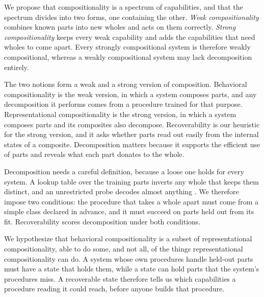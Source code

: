 \documentclass[10pt]{article}
\theoremstyle{plain}
\theoremstyle{remark}
\begin{document}
We propose that compositionality is a spectrum of capabilities, and that the spectrum divides into two forms, one containing the other. \emph{Weak compositionality} combines known parts into new wholes and acts on them correctly. \emph{Strong compositionality} keeps every weak capability and adds the capabilities that need wholes to come apart. Every strongly compositional system is therefore weakly compositional, whereas a weakly compositional system may lack decomposition entirely.

The two notions form a weak and a strong version of composition. Behavioral compositionality is the weak version, in which a system composes parts, and any decomposition it performs comes from a procedure trained for that purpose. Representational compositionality is the strong version, in which a system composes parts and its composites also decompose. Recoverability is our heuristic for the strong version, and it asks whether parts read out easily from the internal states of a composite. Decomposition matters because it supports the efficient use of parts and reveals what each part donates to the whole.

Decomposition needs a careful definition, because a loose one holds for every system. A lookup table over the training parts inverts any whole that keeps them distinct, and an unrestricted probe decodes almost anything \citep{hewitt2019}. We therefore impose two conditions: the procedure that takes a whole apart must come from a simple class declared in advance, and it must succeed on parts held out from its fit. Recoverability scores decomposition under both conditions.

We hypothesize that behavioral compositionality is a subset of representational compositionality, able to do some, and not all, of the things representational compositionality can do. A system whose own procedures handle held-out parts must have a state that holds them, while a state can hold parts that the system's procedures miss. A recoverable state therefore tells us which capabilities a procedure reading it could reach, before anyone builds that procedure.
\end{document}
